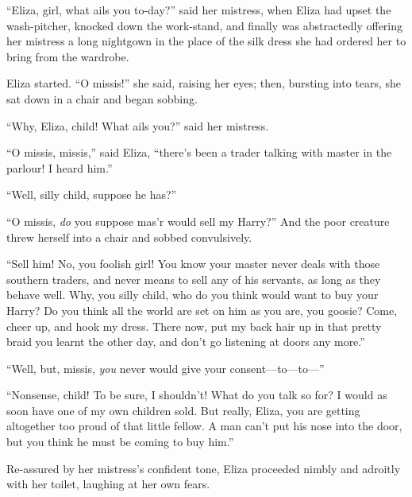 ``Eliza, girl, what ails you to-day?'' said her mistress, when Eliza had upset
the wash-pitcher, knocked down the work-stand, and finally was abstractedly
offering her mistress a long nightgown in the place of the silk dress she had
ordered her to bring from the wardrobe.

Eliza started. ``O missis!'' she said, raising her eyes; then, bursting into
tears, she sat down in a chair and began sobbing.

``Why, Eliza, child! What ails you?'' said her mistress.

``O missis, missis,'' said Eliza, ``there's been a trader talking with master in
the parlour! I heard him.''

``Well, silly child, suppose he has?''

``O missis, \emph{do} you suppose mas'r would sell my Harry?'' And the poor
creature threw herself into a chair and sobbed convulsively.

``Sell him! No, you foolish girl! You know your master never deals with those
southern traders, and never means to sell any of his servants, as long as they
behave well. Why, you silly child, who do you think would want to buy your
Harry? Do you think all the world are set on him as you are, you goosie? Come,
cheer up, and hook my dress. There now, put my back hair up in that pretty braid
you learnt the other day, and don't go listening at doors any more.''

``Well, but, missis, \emph{you} never would give your consent---to---to---''

``Nonsense, child! To be sure, I shouldn't! What do you talk so for? I would as
soon have one of my own children sold. But really, Eliza, you are getting
altogether too proud of that little fellow. A man can't put his nose into the
door, but you think he must be coming to buy him.''

Re-assured by her mistress's confident tone, Eliza proceeded nimbly and adroitly
with her toilet, laughing at her own fears.

